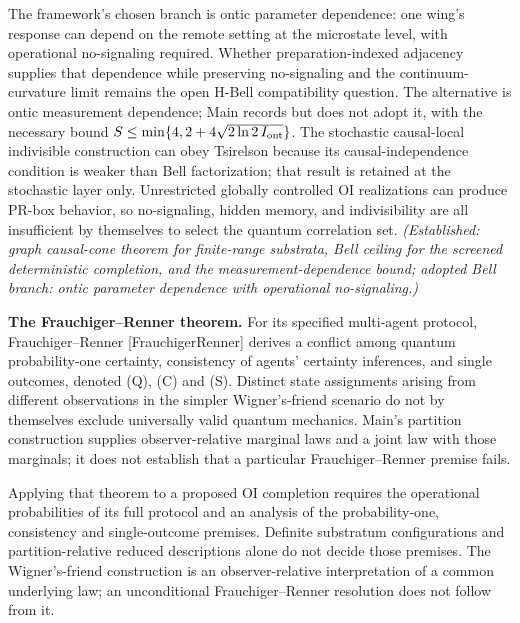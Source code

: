 \documentclass[
]{article}
\begin{document}
The framework's chosen branch is ontic parameter dependence: one wing's
response can depend on the remote setting at the microstate level, with
operational no-signaling required. Whether preparation-indexed adjacency
supplies that dependence while preserving no-signaling and the
continuum-curvature limit remains the open H-Bell compatibility
question. The alternative is ontic measurement dependence; Main records
but does not adopt it, with the necessary bound
\(S\le\min\{4,2+4\sqrt{2\ln2\,I_{\rm ont}}\}\). The stochastic
causal-local indivisible construction can obey Tsirelson because its
causal-independence condition is weaker than Bell factorization; that
result is retained at the stochastic layer only. Unrestricted globally
controlled OI realizations can produce PR-box behavior, so no-signaling,
hidden memory, and indivisibility are all insufficient by themselves to
select the quantum correlation set. \emph{(Established: graph
causal-cone theorem for finite-range substrata, Bell ceiling for the
screened deterministic completion, and the measurement-dependence bound;
adopted Bell branch: ontic parameter dependence with operational
no-signaling.)}

\textbf{The Frauchiger--Renner theorem.} For its specified multi-agent
protocol, Frauchiger--Renner {[}FrauchigerRenner{]} derives a conflict
among quantum probability-one certainty, consistency of agents'
certainty inferences, and single outcomes, denoted (Q), (C) and (S).
Distinct state assignments arising from different observations in the
simpler Wigner's-friend scenario do not by themselves exclude
universally valid quantum mechanics. Main's partition construction
supplies observer-relative marginal laws and a joint law with those
marginals; it does not establish that a particular Frauchiger--Renner
premise fails.

Applying that theorem to a proposed OI completion requires the
operational probabilities of its full protocol and an analysis of the
probability-one, consistency and single-outcome premises. Definite
substratum configurations and partition-relative reduced descriptions
alone do not decide those premises. The Wigner's-friend construction is
an observer-relative interpretation of a common underlying law; an
unconditional Frauchiger--Renner resolution does not follow from it.
\end{document}
